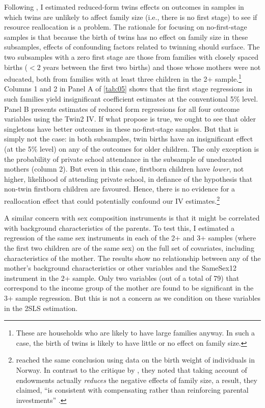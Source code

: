 Following \textcite{angrist_multiple_2010}, I estimated reduced-form twins effects on outcomes in samples in which twins are unlikely to affect family size (i.e., there is no first stage) to see if resource reallocation is a problem. The rationale for focusing on no-first-stage samples is that because the birth of twins has no effect on family size in these subsamples, effects of confounding factors related to twinning should surface. The two subsamples with a zero first stage are those from families with closely spaced births ($ <2 $ years between the first two births) and those whose mothers were not educated, both from families with at least three children in the 2+ sample.\footnote{ These are households who are likely to have large families anyway. In such a case, the birth of twins is likely to have little or no effect on family size. }  Columns 1 and 2 in Panel A of \autoref{tab:05} shows that the first stage regressions in such families yield insignificant coefficient estimates at the conventional 5\% level. Panel B presents estimates of reduced form regressions for all four outcome variables using the Twin2 IV. If what \textcite{rosenzweig_population_2009} propose is true, we ought to see that older singletons have better outcomes in these no-first-stage samples. But that is simply not the case: in both subsamples, twin births have an insignificant effect (at the 5\% level) on any of the outcomes for older children. The only exception is the probability of private school attendance in the subsample of uneducated mothers (column 2). But even in this case, firstborn children have \textit{lower}, not higher, likelihood of attending private school, in defiance of the hypothesis that non-twin firstborn children are favoured. Hence, there is no evidence for a reallocation effect that could potentially confound our IV estimates.\footnote{ \textcite{Black2010} reached the same conclusion using data on the birth weight of individuals in Norway. In contrast to the critique by \textcite{rosenzweig_population_2009}, they noted that taking account of endowments actually \textit{reduces} the negative effects of family size, a result, they claimed, \enquote{is consistent with compensating rather than reinforcing parental investments} \parencite[p.~35]{Black2010}. } 
  
A similar concern with sex composition instruments is that it might be correlated with background characteristics of the parents. To test this, I estimated a regression of the same sex instruments in each of the 2+ and 3+ samples (where the first two children are of the same sex) on the full set of covariates, including characteristics of the mother. The results show no relationship between any of the mother’s background characteristics or other variables and the SameSex12 instrument in the 2+ sample. Only two variables (out of a total of 79) that correspond to the income group of the mother are found to be significant in the 3+ sample regression. But this is not a concern as we condition on these variables in the 2SLS estimation.

